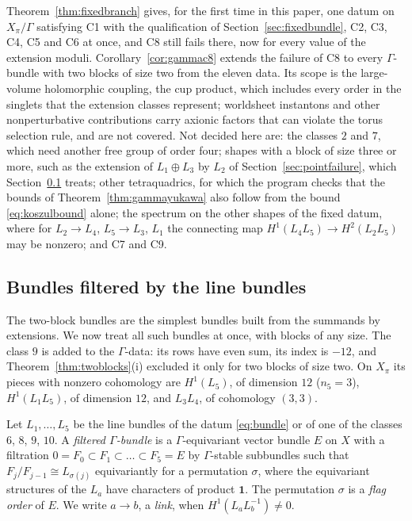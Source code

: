\begin{remark}\label{rem:gammascope}
Theorem~\ref{thm:fixedbranch} gives, for the first time in this paper, one
datum on $X_\pi/\Gamma$ satisfying C1 with the qualification of
Section~\ref{sec:fixedbundle}, C2, C3, C4, C5 and C6 at once, and C8 still
fails there, now for every value of the extension moduli.
Corollary~\ref{cor:gammac8} extends the failure of C8 to every $\Gamma$-bundle
with two blocks of size two from the eleven data. Its scope is the
large-volume holomorphic coupling, the cup product, which includes every
order in the singlets that the extension classes represent; worldsheet
instantons and other nonperturbative contributions carry axionic factors
that can violate the torus selection rule, and are not covered. Not
decided here are: the classes $2$ and $7$, which need another free group
of order four; shapes with a block of size three or more, such as the
extension of $L_1\oplus L_3$ by $L_2$ of Section~\ref{sec:pointfailure},
which Section~\ref{sec:filtered} treats; other tetraquadrics, for which the program checks that the bounds of
Theorem~\ref{thm:gammayukawa} also follow from the bound
\eqref{eq:koszulbound} alone; the spectrum on the other shapes of the
fixed datum, where for $L_2\to L_4$, $L_5\to L_3$, $L_1$ the connecting map
$H^1(L_4L_5)\to H^2(L_2L_5)$ may be nonzero; and C7 and C9.
\end{remark}

\subsection{Bundles filtered by the line bundles}\label{sec:filtered}
The two-block bundles are the simplest bundles built from the summands by
extensions. We now treat all such bundles at once, with blocks of any size.
The class $9$ is added to the $\Gamma$-data: its rows have even sum, its
index is $-12$, and Theorem~\ref{thm:twoblocks}(i) excluded it only for two
blocks of size two. On $X_\pi$ its pieces with nonzero cohomology are
$H^1(L_5)$, of dimension $12$ ($n_5=3$), $H^1(L_1L_5)$, of dimension $12$,
and $L_3L_4$, of cohomology $(3,3)$.

\begin{definition}\label{def:filtered}
Let $L_1,\dots,L_5$ be the line bundles of the datum \eqref{eq:bundle} or
of one of the classes $6$, $8$, $9$, $10$. A \emph{filtered
$\Gamma$-bundle} is a $\Gamma$-equivariant vector bundle $E$ on $X$ with a
filtration $0=F_0\subset F_1\subset\dots\subset F_5=E$ by $\Gamma$-stable
subbundles such that $F_j/F_{j-1}\cong L_{\sigma(j)}$ equivariantly for a
permutation $\sigma$, where the equivariant structures of the $L_a$ have
characters of product $\mathbf 1$. The permutation $\sigma$ is a
\emph{flag order} of $E$. We write $a\to b$, a \emph{link}, when
$H^1(L_aL_b^{-1})\ne0$.
\end{definition}

